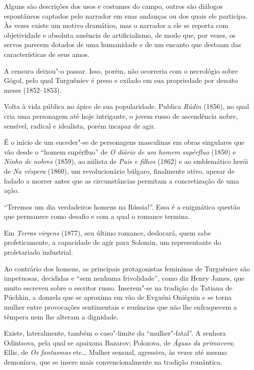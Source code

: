 Alguns são descrições dos usos e costumes do campo, outros são diálogos
espontâneos captados pelo narrador em suas andanças ou dos quais ele
participa. Às vezes existe um motivo dramático, mas o narrador a ele se
reporta com objetividade e absoluta ausência de artificialismo, de modo
que, por vezes, os servos parecem dotados de uma humanidade e de um encanto
que destoam das características de seus amos.

A censura deixou"-o passar. Isso, porém, não ocorreria com o necrológio
sobre Gógol, pelo qual Turguêniev é preso e exilado em sua propriedade
por dezoito meses (1852--1853).

Volta à vida pública no ápice de sua popularidade. Publica \emph{Rúdin} (1856), no qual cria uma personagem até hoje
intrigante, o jovem russo de ascendência nobre, sensível, radical e
idealista, porém incapaz de agir.

É o início de um suceder"-se de personagens masculinas em obras
singulares que vão desde o ``homem supérfluo'' de \emph{O diário de um
homem supérfluo} (1850) e \emph{Ninho de nobres} (1859), ao niilista de
\emph{Pais e filhos} (1862) e ao emblemático herói de \emph{Na véspera}
(1860), um revolucionário búlgaro, finalmente ativo, apesar de fadado a
morrer antes que as circunstâncias permitam a concretização de uma ação.

``Teremos um dia verdadeiros homens na Rússia!''. Essa é a enigmática
questão que permanece como desafio e com a qual o romance termina.

Em \emph{Terras virgens} (1877), seu último romance, deslocará, quem
sabe profeticamente, a capacidade de agir para Solomin, um representante
do proletariado industrial.

Ao contrário dos homens, as principais protagonistas femininas de
Turguêniev são impetuosas, decididas e ``sem nenhuma frivolidade'', como
diz Henry James, que muito escreveu sobre o escritor russo. Inserem"-se
na tradição da Tatiana de Púchkin, a donzela que se aproxima em vão de Evguéni Oniéguin e se
torna mulher entre provocações sentimentais e renúncias que não lhe
enfraquecem a têmpera nem lhe alteram a dignidade.

Existe, lateralmente, também o caso"-limite da ``mulher"-fatal''. A
senhora Odíntsova, pela qual se apaixona Bazarov; Polozova, de
\emph{Águas da primavera}; Ellis, de \emph{Os fantasmas} etc\ldots{} Mulher
sensual, agressiva, às vezes até mesmo demoníaca, que se insere mais
convencionalmente na tradição romântica.

